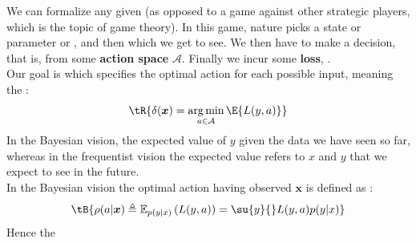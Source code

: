 We can formalize any given  (as 
opposed to a game against other strategic players, which is the topic of game theory).
In this game, nature picks a state or parameter or , and then  which we get to see. We
then have to make a decision, that is,  from some 
\textbf{action space} $\mathcal{A}$. Finally we incur some \textbf{loss}, .\\
Our goal is  which specifies the optimal
action for each possible input, meaning the :
$$ \tR{\delta(\bm{x}) = \argmin_{{a\in \mathcal{A}}} \E{{L(y, a)}}} $$
In the Bayesian vision, the expected value of $y$ given the data we have seen so far, 
whereas in the frequentist vision the expected value refers to $x$ and $y$ that we expect
to see in the future.\\
In the Bayesian vision the optimal action having observed $\bm{x}$ is defined as 
:
$$ \tB{\rho(a|\bm{x})\triangleq\mathbb{E}_{p(y|x)}\left(L(y, a)\right) = \su{y}{}L(y,
a) p(y|x)}$$
Hence the 

